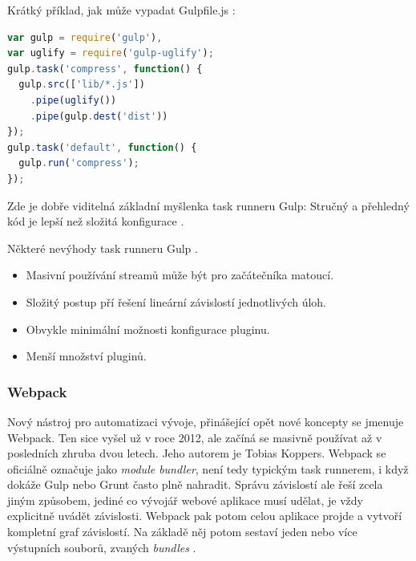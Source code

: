 \pagebreak
\vspace{0.3cm}
\noindent Krátký příklad, jak může vypadat Gulpfile.js \cite{zdrojak_gulp}:
\begin{lstlisting}[language=Javascript,caption={Ukázka syntaxe souboru Gulpfile.js}]
var gulp = require('gulp'),
var uglify = require('gulp-uglify');
gulp.task('compress', function() {
  gulp.src(['lib/*.js'])
    .pipe(uglify())
    .pipe(gulp.dest('dist'))
});
gulp.task('default', function() {
  gulp.run('compress');
});
\end{lstlisting}

Zde je dobře viditelná základní myšlenka task runneru Gulp: Stručný a přehledný kód je lepší než složitá konfigurace \cite{gulp} \cite{zdrojak_gulp}.

\vspace{0,3cm}
\noindent Některé nevýhody task runneru Gulp \cite{zdrojak_gulp}.
\begin{itemize}
\item Masivní používání streamů může být pro začátečníka matoucí. 
\item Složitý postup pří řešení lineární závislostí jednotlivých úloh.
\item Obvykle minimální možnosti konfigurace pluginu.
\item Menší množství pluginů.
\end{itemize}

\subsubsection{Webpack}
\label{sec:webpack}
Nový nástroj pro automatizaci vývoje, přinášející opět nové koncepty se jmenuje Webpack. Ten sice vyšel už v roce 2012, ale začíná se masivně používat až v posledních zhruba dvou letech. Jeho autorem je Tobias Koppers. Webpack se oficiálně označuje jako \textit{module bundler}, není tedy typickým task runnerem, i když dokáže Gulp nebo Grunt často plně nahradit. Správu závislostí ale řeší zcela jiným způsobem, jediné co vývojář webové aplikace musí udělat, je vždy explicitně uvádět závislosti. Webpack pak potom celou aplikace projde a vytvoří kompletní graf závislostí. Na základě něj potom sestaví jeden nebo více výstupních souborů, zvaných \textit{bundles} \cite{webpack} \cite{webpack_book}.

